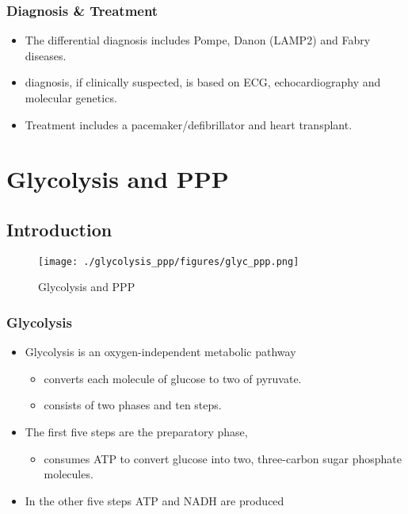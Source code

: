 \documentclass{scrartcl}
\begin{document}
\subsubsection{Diagnosis \& Treatment}
\label{sec:org0393aee}
\begin{itemize}
\item The differential diagnosis includes Pompe, Danon (LAMP2) and Fabry diseases.

\item diagnosis, if clinically suspected, is based on ECG,
echocardiography and molecular genetics.

\item Treatment includes a pacemaker/defibrillator and heart transplant.
\end{itemize}

\section{Glycolysis and PPP}
\label{sec:org7b33c0e}
\subsection{Introduction}
\label{sec:org27e6397}
\begin{figure}[htbp]
\centering
\texttt{[image: ./glycolysis\_ppp/figures/glyc\_ppp.png]}
\caption{\label{fig:orgb7ffa7e}
Glycolysis and PPP}
\end{figure}

\subsubsection{Glycolysis}
\label{sec:org0c2bb72}
\begin{itemize}
\item Glycolysis is an oxygen-independent metabolic pathway
\begin{itemize}
\item converts each molecule of glucose to two of pyruvate.
\item consists of two phases and ten steps.
\end{itemize}
\item The first five steps are the preparatory phase,
\begin{itemize}
\item consumes ATP to convert glucose into two, three-carbon sugar
phosphate molecules.
\end{itemize}
\item In the other five steps ATP and NADH are produced
\end{itemize}
\end{document}
